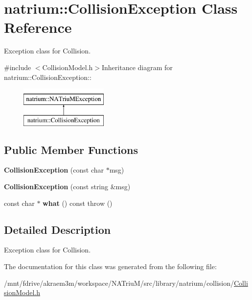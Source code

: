 \hypertarget{classnatrium_1_1CollisionException}{
\section{natrium::CollisionException Class Reference}
\label{classnatrium_1_1CollisionException}
}


Exception class for Collision.  


{\ttfamily \#include $<$CollisionModel.h$>$}Inheritance diagram for natrium::CollisionException::\begin{figure}[H]
\begin{center}
\leavevmode
\includegraphics[height=2cm]{classnatrium_1_1CollisionException}
\end{center}
\end{figure}
\subsection*{Public Member Functions}
\begin{DoxyCompactItemize}
\item 
\hypertarget{classnatrium_1_1CollisionException_aee60989a43066bd65b0481cde4d96980}{
{\bfseries CollisionException} (const char $\ast$msg)}
\label{classnatrium_1_1CollisionException_aee60989a43066bd65b0481cde4d96980}

\item 
\hypertarget{classnatrium_1_1CollisionException_a36cefc1d84dec3d981a84250de56aca1}{
{\bfseries CollisionException} (const string \&msg)}
\label{classnatrium_1_1CollisionException_a36cefc1d84dec3d981a84250de56aca1}

\item 
\hypertarget{classnatrium_1_1CollisionException_a700f9ee10ef668a35cb227d8a7b01d4c}{
const char $\ast$ {\bfseries what} () const   throw ()}
\label{classnatrium_1_1CollisionException_a700f9ee10ef668a35cb227d8a7b01d4c}

\end{DoxyCompactItemize}


\subsection{Detailed Description}
Exception class for Collision. 

The documentation for this class was generated from the following file:\begin{DoxyCompactItemize}
\item 
/mnt/fdrive/akraem3m/workspace/NATriuM/src/library/natrium/collision/\hyperlink{CollisionModel_8h}{CollisionModel.h}\end{DoxyCompactItemize}
